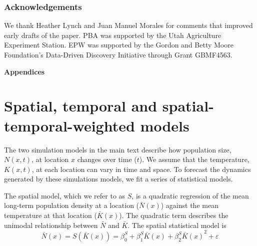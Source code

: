 \documentclass[11pt]{article}
\begin{document}
\subsubsection*{Acknowledgements}

We thank Heather Lynch and Juan Manuel Morales for comments that improved early drafts of the paper. PBA was supported by the Utah Agriculture Experiment Station. EPW was supported by the Gordon and Betty Moore Foundation’s Data-Driven Discovery Initiative through Grant GBMF4563. 

\newpage
\renewcommand{\refname}{Literature cited}





\clearpage 
\newpage 

\setcounter{page}{1}
\setcounter{equation}{0}
\setcounter{figure}{0}
\setcounter{section}{0}
\setcounter{table}{0}

\centerline{\Large \textbf{Appendices}}

\renewcommand{\thesection}{\Alph{section}}

\section{Spatial, temporal and spatial-temporal-weighted models}\label{models}

The two simulation models in the main text describe how population size, $N(x,t)$, at location $x$ changes over time ($t$). We assume that the temperature, $K(x,t)$, at each location can vary in time and space. To forecast the dynamics generated by these simulations models, we fit a series of statistical models.   

The spatial model, which we refer to as $S$, is a quadratic regression of the mean long-term population density at a location ($\bar{N}(x)$) against the mean temperature at that location ($\bar{K}(x)$).  The quadratic term describes the unimodal relationship between $\bar{N}$ and $\bar{K}$. The spatial statistical model is
\begin{equation}
\bar{N}(x) = S(\bar{K}(x)) = \beta^S_0 +  \beta^S_1 \bar{K}(x) +\beta^S_2 {\bar{K}(x)}^2 + \varepsilon
\label{eqn:spatial_regression}
\end{equation}
\end{document}
